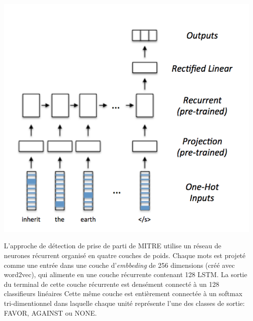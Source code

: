 \documentclass[11pt,a4paper,oldfontcommands]{memoir}
\begin{document}
\begin{center}
 \includegraphics[scale=0.25]{../../img/model/mitre/model.png}
 \label{mitre_model}
\end{center}

L'approche de détection de prise de parti de MITRE utilise un réseau de neurones récurrent organisé en quatre couches de poids.
Chaque mots est projeté comme une entrée dans une couche d'\textit{embbeding} de 256 dimensions (créé avec word2vec), qui alimente en une couche récurrente contenant 128 LSTM.
La sortie du terminal
de cette couche récurrente est densément connecté à un 128 classifieurs linéaires
Cette même couche est entièrement connectée à un softmax tri-dimentionnel dans laquelle chaque unité représente l'une des classes de sortie: FAVOR, AGAINST ou NONE.
\end{document}
